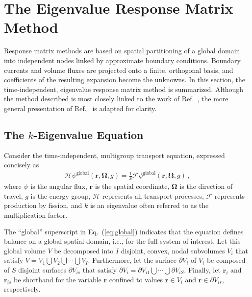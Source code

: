 \documentclass[5p,times,twocolumn,10pt]{elsarticle}
\newcommand{\oper}[1]{\mathcal{#1}}
\newcommand{\EQ}[1]{Eq.~(\ref{#1})}               %
\newcommand{\REF}[1]{Ref.~\citen{#1}}               %
\begin{document}
    \section{The Eigenvalue Response Matrix Method}

    Response matrix methods are based on spatial partitioning of a global
    domain
    into independent nodes linked by approximate boundary conditions. Boundary
    currents and volume fluxes are projected onto a finite, orthogonal basis,
    and coefficients of the resulting expansion become the unknowns. In this
    section, the time-independent, eigenvalue response matrix method  is
    summarized.  Although the method described is most closely linked to the
    work of \REF{RobertsSerment}, the more general presentation of
    \REF{roberts2014hot} is adapted for clarity.

    \subsection{The $k$-Eigenvalue Equation}

    Consider the time-independent, multigroup transport equation, expressed
    concisely as
    \begin{equation}
        \begin{split}
            \oper{H}\psi^{\mathrm{global}}(\mathbf{r},\bm{\Omega},g) =
            \frac{1}{k} \oper{F}
            \psi^{\mathrm{global}}(\mathbf{r},\bm{\Omega},g)  \, ,
        \end{split}
        \label{eq:global}
    \end{equation}
    where $\psi$ is the angular flux, $\mathbf{r}$ is the spatial coordinate,
    $\bm{\Omega}$ is the direction of travel, $g$ is the energy group,
    $\oper{H}$ represents all transport processes, $\oper{F}$ represents
    production by fission, and $k$ is an eigenvalue often referred to as the
    multiplication factor.

    The ``global'' superscript in \EQ{eq:global} indicates that the equation
    defines balance on a global spatial domain, i.e., for the full system of
    interest. Let this global volume $V$ be decomposed into $I$ disjoint,
    convex, nodal subvolumes $V_i$  that satisfy $V = V_1 \bigcup V_2
    \bigcup \cdots \bigcup V_I$. Furthermore, let the surface $\partial V_i$
    of $V_i$ be composed of $S$ disjoint surfaces $\partial V_{is}$
    that satisfy $\partial V_i = \partial V_{i1} \bigcup \cdots \bigcup
    \partial V_{iS}$. Finally, let $\mathbf{r}_i$ and
    $\mathbf{r}_{is}$ be shorthand for the variable $\mathbf{r}$ confined
    to values $\mathbf{r}\in V_i$ and $\mathbf{r} \in \partial V_{is}$,
    respectively.
\end{document}
